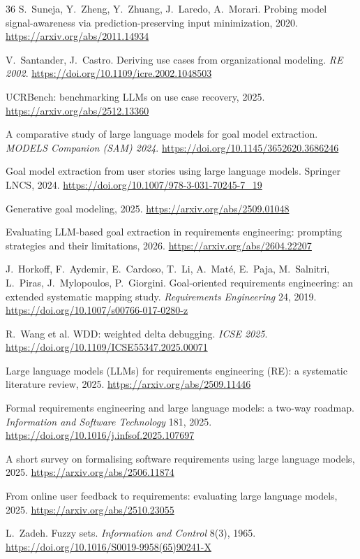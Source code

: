 \documentclass[sigconf,nonacm]{acmart}
\begin{document}
\begin{thebibliography}{36}
 S.~Suneja, Y.~Zheng, Y.~Zhuang, J.~Laredo,
A.~Morari. Probing model signal-awareness via
prediction-preserving input minimization, 2020.
\url{https://arxiv.org/abs/2011.14934}

 V.~Santander, J.~Castro. Deriving use
cases from organizational modeling. \emph{RE 2002}.
\url{https://doi.org/10.1109/icre.2002.1048503}

 UCRBench: benchmarking LLMs on use case
recovery, 2025. \url{https://arxiv.org/abs/2512.13360}

 A comparative study of large language models
for goal model extraction. \emph{MODELS Companion (SAM) 2024}.
\url{https://doi.org/10.1145/3652620.3686246}

 Goal model extraction from user stories
using large language models. Springer LNCS, 2024.
\url{https://doi.org/10.1007/978-3-031-70245-7_19}

 Generative goal modeling, 2025.
\url{https://arxiv.org/abs/2509.01048}

 Evaluating LLM-based goal extraction in
requirements engineering: prompting strategies and their
limitations, 2026. \url{https://arxiv.org/abs/2604.22207}

 J.~Horkoff, F.~Aydemir, E.~Cardoso,
T.~Li, A.~Mat\'e, E.~Paja, M.~Salnitri, L.~Piras,
J.~Mylopoulos, P.~Giorgini. Goal-oriented requirements
engineering: an extended systematic mapping study.
\emph{Requirements Engineering} 24, 2019.
\url{https://doi.org/10.1007/s00766-017-0280-z}

 R.~Wang et al. WDD: weighted delta debugging.
\emph{ICSE 2025}.
\url{https://doi.org/10.1109/ICSE55347.2025.00071}

 Large language models (LLMs) for
requirements engineering (RE): a systematic literature review,
2025. \url{https://arxiv.org/abs/2509.11446}

 Formal requirements engineering and large
language models: a two-way roadmap. \emph{Information and
Software Technology} 181, 2025.
\url{https://doi.org/10.1016/j.infsof.2025.107697}

 A short survey on formalising
software requirements using large language models, 2025.
\url{https://arxiv.org/abs/2506.11874}

 From online user feedback to
requirements: evaluating large language models, 2025.
\url{https://arxiv.org/abs/2510.23055}

 L.~Zadeh. Fuzzy sets. \emph{Information and
Control} 8(3), 1965.
\url{https://doi.org/10.1016/S0019-9958(65)90241-X}

\end{thebibliography}
\end{document}
